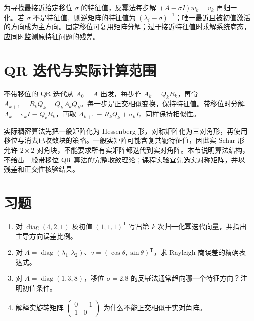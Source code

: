 为寻找最接近给定移位 $\sigma$ 的特征值，反幂法每步解 $(A-\sigma I)w_k=v_k$ 再归一化。若 $\sigma$ 不是特征值，则逆矩阵的特征值为 $(\lambda_i-\sigma)^{-1}$；唯一最近且被初值激活的方向成为主方向。固定移位可复用矩阵分解；过于接近特征值时求解系统病态，应同时监测原特征问题的残差。

\section{QR 迭代与实际计算范围}
不带移位的 QR 迭代从 $A_0=A$ 出发，每步作 $A_k=Q_kR_k$，再令 $A_{k+1}=R_kQ_k=Q_k^{\mathsf T}A_kQ_k$。每一步是正交相似变换，保持特征值。带移位时分解 $A_k-\sigma_kI=Q_kR_k$，再取 $A_{k+1}=R_kQ_k+\sigma_kI$，同样保持相似性。

实际稠密算法先把一般矩阵化为 Hessenberg 形，对称矩阵化为三对角形，再使用移位与消去已收敛块的策略。一般实矩阵可能含复共轭特征值，因此实 Schur 形允许 $2\times2$ 对角块，不能要求所有实矩阵都迭代到实对角阵。本节说明算法结构，不给出一般带移位 QR 算法的完整收敛理论；课程实验宜先选实对称矩阵，并以残差和正交性核验结果。

\section{习题}
\begin{enumerate}[label=\arabic*.]
\item\label{exr:na-eigen-power} 对 $\operatorname{diag}(4,2,1)$ 及初值 $(1,1,1)^{\mathsf T}$ 写出第 $k$ 次归一化幂迭代向量，并指出主导方向误差比例。
\item\label{exr:na-eigen-rayleigh} 对 $A=\operatorname{diag}(\lambda_1,\lambda_2)$、$v=(\cos\theta,\sin\theta)^{\mathsf T}$，求 Rayleigh 商误差的精确表达式。
\item\label{exr:na-eigen-shift} 对 $A=\operatorname{diag}(1,3,8)$，移位 $\sigma=2.8$ 的反幂法通常趋向哪一个特征方向？注明初值条件。
\item\label{exr:na-eigen-rotation} 解释实旋转矩阵 $\begin{pmatrix}0&-1\\1&0\end{pmatrix}$ 为什么不能正交相似于实对角阵。
\end{enumerate}

